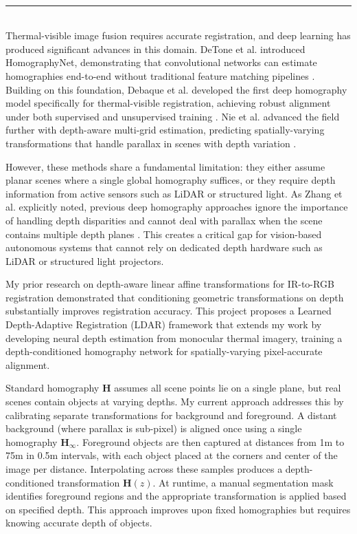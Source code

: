 \documentclass[12pt]{article}
\newcommand{\sect}[1]{\noindent{\color{garnet}\textbf{\textsc{#1}}.}}
\newcommand{\subsect}[1]{\noindent{\color{garnet}\textit{#1.}}}
\begin{document}
\sloppy

\\[-0.8em]
{\color{garnet}\rule{\textwidth}{0.5pt}}\\[0.2em]
\sect{Project Overview}
Thermal-visible image fusion requires accurate registration, and deep learning has produced significant advances in this domain. DeTone et al. introduced HomographyNet, demonstrating that convolutional networks can estimate homographies end-to-end without traditional feature matching pipelines \cite{detone2016}. Building on this foundation, Debaque et al. developed the first deep homography model specifically for thermal-visible registration, achieving robust alignment under both supervised and unsupervised training \cite{debaque2022}. Nie et al. advanced the field further with depth-aware multi-grid estimation, predicting spatially-varying transformations that handle parallax in scenes with depth variation \cite{nie2022}.

However, these methods share a fundamental limitation: they either assume planar scenes where a single global homography suffices, or they require depth information from active sensors such as LiDAR or structured light. As Zhang et al. explicitly noted, previous deep homography approaches ignore the importance of handling depth disparities and cannot deal with parallax when the scene contains multiple depth planes \cite{zhang2020}. This creates a critical gap for vision-based autonomous systems that cannot rely on dedicated depth hardware such as LiDAR or structured light projectors.

My prior research on depth-aware linear affine transformations for IR-to-RGB registration demonstrated that conditioning geometric transformations on depth substantially improves registration accuracy. This project proposes a Learned Depth-Adaptive Registration (LDAR) framework that extends my work by developing neural depth estimation from monocular thermal imagery, training a depth-conditioned homography network for spatially-varying pixel-accurate alignment.

\sect{Research Methods}

\subsect{Problem Formalization}
Standard homography $\mathbf{H}$ assumes all scene points lie on a single plane, but real scenes contain objects at varying depths. My current approach addresses this by calibrating separate transformations for background and foreground. A distant background (where parallax is sub-pixel) is aligned once using a single homography $\mathbf{H}_\infty$. Foreground objects are then captured at distances from 1m to 75m in 0.5m intervals, with each object placed at the corners and center of the image per distance. Interpolating across these samples produces a depth-conditioned transformation $\mathbf{H}(z)$. At runtime, a manual segmentation mask identifies foreground regions and the appropriate transformation is applied based on specified depth. This approach improves upon fixed homographies but requires knowing accurate depth of objects.
\end{document}
